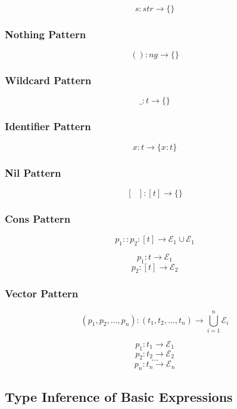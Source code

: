 \documentclass[titlepage]{article}
\begin{document}
$$s : str \rightarrow \{\}$$

\subsubsection{Nothing Pattern}

$$() : ng \rightarrow \{\}$$

\subsubsection{Wildcard Pattern}

$$\_ : t \rightarrow \{\}$$

\subsubsection{Identifier Pattern}

$$x : t \rightarrow \{x : t\}$$

\subsubsection{Nil Pattern}

$$[\text{ }] : [t] \rightarrow \{\}$$

\subsubsection{Cons Pattern}

$$p_1 :: p_2 : [t] \rightarrow \mathcal{E}_1 \cup \mathcal{E}_1$$

\noindent\makebox[\linewidth]{\rule{1.2in}{0.4pt}}

$$p_1 : t \rightarrow \mathcal{E}_1$$
$$p_2 : [t] \rightarrow \mathcal{E}_2$$

\subsubsection{Vector Pattern}

$$(p_1, p_2, \dots, p_n) : (t_1, t_2, \dots, t_n) \rightarrow \bigcup _ {i = 1} ^ n \mathcal{E}_i$$

\noindent\makebox[\linewidth]{\rule{1.2in}{0.4pt}}

$$p_1 : t_1 \rightarrow \mathcal{E}_1$$
$$p_2 : t_2 \rightarrow \mathcal{E}_2$$
$$\dots$$
$$p_n : t_n \rightarrow \mathcal{E}_n$$


\subsection{Type Inference of Basic Expressions}
\end{document}
